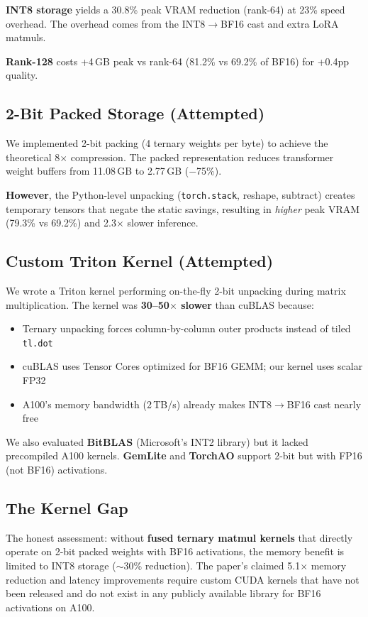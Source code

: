 \documentclass[11pt]{article}
\begin{document}
\textbf{INT8 storage} yields a 30.8\% peak VRAM reduction (rank-64) at 23\% speed overhead.
The overhead comes from the INT8$\to$BF16 cast and extra LoRA matmuls.

\textbf{Rank-128} costs +4\,GB peak vs rank-64 (81.2\% vs 69.2\% of BF16) for +0.4pp quality.

\subsection{2-Bit Packed Storage (Attempted)}

We implemented 2-bit packing (4 ternary weights per byte) to achieve the theoretical 8$\times$ compression.
The packed representation reduces transformer weight buffers from 11.08\,GB to 2.77\,GB ($-$75\%).

\textbf{However}, the Python-level unpacking (\texttt{torch.stack}, reshape, subtract) creates temporary tensors that negate the static savings, resulting in \emph{higher} peak VRAM (79.3\% vs 69.2\%) and 2.3$\times$ slower inference.

\subsection{Custom Triton Kernel (Attempted)}

We wrote a Triton kernel performing on-the-fly 2-bit unpacking during matrix multiplication.
The kernel was \textbf{30--50$\times$ slower} than cuBLAS because:
\begin{itemize}[nosep,leftmargin=1.5em]
  \item Ternary unpacking forces column-by-column outer products instead of tiled \texttt{tl.dot}
  \item cuBLAS uses Tensor Cores optimized for BF16 GEMM; our kernel uses scalar FP32
  \item A100's memory bandwidth (2\,TB/s) already makes INT8$\to$BF16 cast nearly free
\end{itemize}

We also evaluated \textbf{BitBLAS} (Microsoft's INT2 library) but it lacked precompiled A100 kernels.
\textbf{GemLite} and \textbf{TorchAO} support 2-bit but with FP16 (not BF16) activations.

\subsection{The Kernel Gap}

The honest assessment: without \textbf{fused ternary matmul kernels} that directly operate on 2-bit packed weights with BF16 activations, the memory benefit is limited to INT8 storage ($\sim$30\% reduction).
The paper's claimed 5.1$\times$ memory reduction and latency improvements require custom CUDA kernels that have not been released and do not exist in any publicly available library for BF16 activations on A100.
\end{document}
